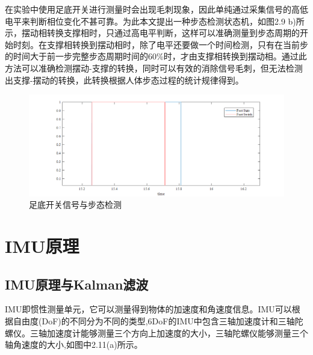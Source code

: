 在实验中使用足底开关进行测量时会出现毛刺现象，因此单纯通过采集信号的高低电平来判断相位变化不甚可靠。为此本文提出一种步态检测状态机，如图2.9 b)所示，摆动相转换支撑相时，只通过高电平判断，这样可以准确测量到步态周期的开始时刻。在支撑相转换到摆动相时，除了电平还要做一个时间检测，只有在当前步的时间大于前一步完整步态周期时间的60\%时，才由支撑相转换到摆动相。通过此方法可以准确检测摆动-支撑的转换，同时可以有效的消除信号毛刺，但无法检测出支撑-摆动的转换，此转换根据人体步态过程的统计规律得到。

\begin{figure}[htb]
    \includegraphics[width=16cm]{fig/f33.png}
    \caption{足底开关信号与步态检测}
    \label{fig:mark}
\end{figure}

\section{IMU原理}
\subsection{IMU原理与Kalman滤波}
IMU即惯性测量单元，它可以测量得到物体的加速度和角速度信息。IMU可以根据自由度(DoF)的不同分为不同的类型,6DoF的IMU中包含三轴加速度计和三轴陀螺仪。三轴加速度计能够测量三个方向上加速度的大小，三轴陀螺仪能够测量三个轴角速度的大小,如图中2.11(a)所示。

